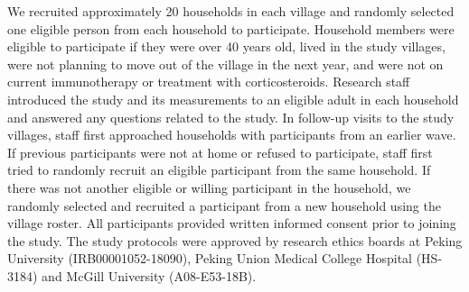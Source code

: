 \documentclass[
  letterpaper,
  DIV=11,
  numbers=noendperiod]{scrartcl}
\providecommand{\DIFadd}[1]{{\protect\color{blue}\uwave{#1}}} %
\providecommand{\DIFaddbegin}{} %
\providecommand{\DIFaddend}{} %
\providecommand{\DIFdelbegin}{} %
\providecommand{\DIFdelend}{} %
\newcommand{\DIFscaledelfig}{0.5}
\newlength{\DIFdelgraphicswidth} %
\newlength{\DIFdelgraphicsheight} %
\newcommand{\DIFaddincludegraphics}[2][]{{\color{blue}\fbox{\DIFOincludegraphics[#1]{#2}}}} %
\newcommand{\DIFdelincludegraphics}[2][]{%
\sbox{\DIFdelgraphicsbox}{\DIFOincludegraphics[#1]{#2}}%
\settoboxwidth{\DIFdelgraphicswidth}{\DIFdelgraphicsbox} %
\settoboxtotalheight{\DIFdelgraphicsheight}{\DIFdelgraphicsbox} %
\scalebox{\DIFscaledelfig}{%
\parbox[b]{\DIFdelgraphicswidth}{\usebox{\DIFdelgraphicsbox}\\[-\baselineskip] \rule{\DIFdelgraphicswidth}{0em}}\llap{\resizebox{\DIFdelgraphicswidth}{\DIFdelgraphicsheight}{%
\setlength{\unitlength}{\DIFdelgraphicswidth}%
\begin{picture}(1,1)%
\thicklines\linethickness{2pt} %
{\color[rgb]{1,0,0}\put(0,0){\framebox(1,1){}}}%
{\color[rgb]{1,0,0}\put(0,0){\line( 1,1){1}}}%
{\color[rgb]{1,0,0}\put(0,1){\line(1,-1){1}}}%
\end{picture}%
}\hspace*{3pt}}} %
} %
\DeclareRobustCommand{\DIFaddbegin}{\DIFOaddbegin \let\includegraphics\DIFaddincludegraphics} %
\DeclareRobustCommand{\DIFaddend}{\DIFOaddend \let\includegraphics\DIFOincludegraphics} %
\DeclareRobustCommand{\DIFdelbegin}{\DIFOdelbegin \let\includegraphics\DIFdelincludegraphics} %
\DeclareRobustCommand{\DIFdelend}{\DIFOaddend \let\includegraphics\DIFOincludegraphics} %
\begin{document}
We recruited approximately 20 households in each village and randomly
selected one eligible person from each household to participate.
Household members were eligible to participate if they were over 40
years old, lived in the study villages, were not planning to move out of
the village in the next year, and were not on current immunotherapy or
treatment with corticosteroids. Research staff introduced the study and
its measurements to an eligible adult in each household and answered any
questions related to the study. In follow-up visits to the study
villages, staff first approached households with participants from an
earlier wave. If previous participants were not at home or refused to
participate, staff first tried to randomly recruit an eligible
participant from the same household. If there was not another eligible
or willing participant in the household, we randomly selected and
recruited a participant from a new household using the village roster.
All participants provided written informed consent prior to joining the
study. The study protocols were approved by research ethics boards at
Peking University (IRB00001052-18090), Peking Union Medical College
Hospital (HS-3184) and McGill University (A08-E53-18B).

\DIFdelbegin %
\DIFdelend \DIFaddbegin \subsection{\DIFadd{Data Collection Overview}}\label{data-collection-overview}
\DIFaddend 
\end{document}
